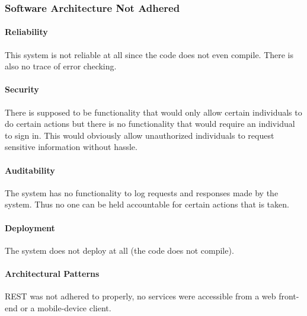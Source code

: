 \documentclass{article}
\begin{document}
		\subsubsection{Software Architecture Not Adhered}
			\paragraph{Reliability} This system is not reliable at all since the code does not even compile. There is also no trace of error checking.
			\paragraph{Security} There is supposed to be functionality that would only allow certain individuals to do certain actions but there is no functionality that would require an individual to sign in. This would obviously allow unauthorized individuals to request sensitive information without hassle.
			\paragraph{Auditability} The system has no functionality to log requests and responses made by the system. Thus no one can be held accountable for certain actions that is taken.
			\paragraph{Deployment} The system does not deploy at all (the code does not compile).
			\paragraph{Architectural Patterns} REST was not adhered to properly, no services were accessible from a web front-end or a mobile-device client.
\end{document}

